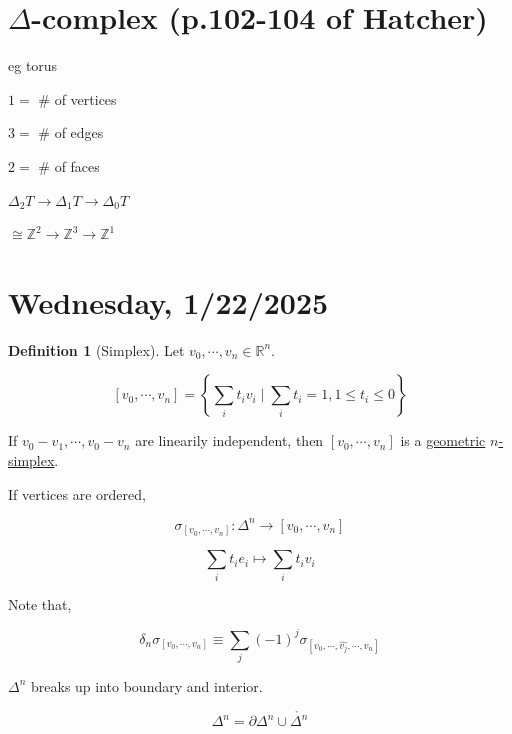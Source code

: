 \documentclass{article}
\theoremstyle{definition}
\newtheorem*{definition}{Definition}
\begin{document}
    \section*{\(\Delta\)-complex (p.102-104 of Hatcher)}

    eg torus

    \begin{center}
    \end{center}


    \(1 =\) \# of vertices
    
    \(3 =\) \# of edges

    \(2 =\) \# of faces

    \(\Delta_2 T \to \Delta_1 T \to \Delta_0 T\) 

    \(\cong \mathbb{Z}^2 \to \mathbb{Z}^3 \to \mathbb{Z}^1\) 

    \section*{Wednesday, 1/22/2025}
    
    \begin{definition}
        [Simplex] Let \(v_0, \cdots , v_n \in \mathbb{R}^n\).

        \[
            [v_0, \cdots , v_n] = \left\{ \sum_{i} t_i v_i \mid \sum_{i} t_i = 1, 1 \leq t_i \leq 0 \right\}
        \]

        If \(v_0 - v_1, \cdots , v_0 - v_n\) are linearily independent, then \([v_0, \cdots , v_n]\) is a \underline{geometric} \underline{\(n\)-simplex}.
    \end{definition}

    If vertices are ordered,

    \[
        \sigma_{[v_0, \cdots , v_n]} : \Delta^n \to [v_0, \cdots , v_n]
    \]

    \[
        \sum_{i} t_i e_i \mapsto \sum_{i} t_i v_i
    \]

    Note that,

    \[
        \delta_n \sigma_{[v_0, \cdots , v_n]} \equiv  \sum_{j} (-1)^j \sigma_{[v_0, \cdots , \widehat{v_j}, \cdots , v_n]}
    \]

    \(\Delta^n\) breaks up into boundary and interior.

    \[
        \Delta^n = \partial \Delta^n \cup \mathring{\Delta^n}
    \]
\end{document}
